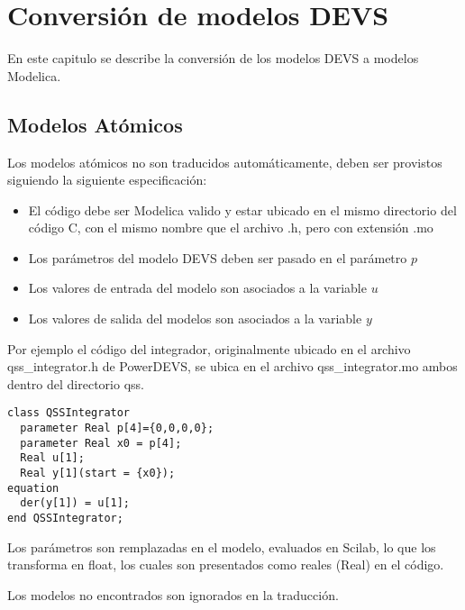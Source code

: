 \documentclass[a4paper,	11pt]{report}
\begin{document}
\chapter{Conversión de modelos DEVS}

En este capitulo se describe la conversión de los modelos DEVS a modelos Modelica.

\section{Modelos Atómicos}
Los modelos atómicos no son traducidos automáticamente, deben ser provistos siguiendo la siguiente especificación:

\begin{itemize}
\item El código debe ser Modelica valido y estar ubicado en el mismo directorio del código C, con el mismo nombre que el archivo .h, pero con extensión .mo
\item Los parámetros del modelo DEVS deben ser pasado en el parámetro $p$
\item Los valores de entrada del modelo son asociados a la variable $u$
\item Los valores de salida del modelos son asociados a la variable $y$
\end{itemize}

Por ejemplo el código del integrador, originalmente ubicado en el archivo qss\_integrator.h de PowerDEVS, se ubica en el archivo qss\_integrator.mo ambos dentro del directorio qss.

\begin{verbatim}
class QSSIntegrator
  parameter Real p[4]={0,0,0,0};
  parameter Real x0 = p[4];
  Real u[1];
  Real y[1](start = {x0});
equation
  der(y[1]) = u[1];
end QSSIntegrator;
\end{verbatim}

Los parámetros son remplazadas en el modelo, evaluados en Scilab, lo que los transforma en float, los cuales son presentados como reales (Real) en el código.

Los modelos no encontrados son ignorados en la traducción.
\end{document}
